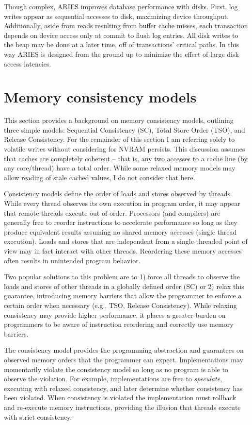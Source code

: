 Though complex, ARIES improves database performance with disks.
First, log writes appear as sequential accesses to disk, maximizing device throughput.
Additionally, aside from reads resulting from buffer cache misses, each transaction depends on device access only at commit to flush log entries.
All disk writes to the heap may be done at a later time, off of transactions' critical paths.
In this way ARIES is designed from the ground up to minimize the effect of large disk access latencies.

\section{Memory consistency models}
\label{sec:Background:MemoryConsistency}

This section provides a background on memory consistency models, outlining three simple models: Sequential Consistency (SC), Total Store Order (TSO), and Release Consistency.
For the remainder of this section I am referring solely to volatile writes without considering for NVRAM persists.
This discussion assumes that caches are completely coherent -- that is, any two accesses to a cache line (by any core/thread) have a total order.
While some relaxed memory models may allow reading of stale cached values, I do not consider that here.

Consistency models define the order of loads and stores observed by threads.
While every thread observes its own execution in program order, it may appear that remote threads execute out of order.
Processors (and compilers) are generally free to reorder instructions to accelerate performance so long as they produce equivalent results assuming no shared memory accesses (single thread execution).
Loads and stores that are independent from a single-threaded point of view may in fact interact with other threads.
Reordering these memory accesses often results in unintended program behavior.

Two popular solutions to this problem are to 1) force all threads to observe the loads and stores of other threads in a globally defined order (SC) or 2) relax this guarantee, introducing memory barriers that allow the programmer to enforce a certain order when necessary (e.g., TSO, Release Consistency).
While relaxing consistency may provide higher performance, it places a greater burden on programmers to be aware of instruction reordering and correctly use memory barriers.

The consistency model provides the programming abstraction and guarantees on observed memory orders that the programmer can expect.
Implementations may momentarily violate the consistency model so long as no program is able to observe the violation.
For example, implementations are free to \emph{speculate}, executing with relaxed consistency, and later determine whether consistency has been violated.
When consistency is violated the implementation must rollback and re-execute memory instructions, providing the illusion that threads execute with strict consistency.

